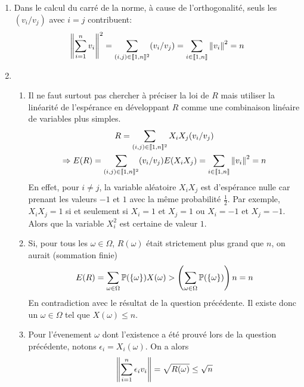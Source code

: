 \begin{enumerate}
  \item Dans le calcul du carré de la norme, à cause de l'orthogonalité, seuls les $(v_i/v_j)$ avec $i=j$ contribuent:
\begin{displaymath}
  \left\Vert\sum_{i=1}^n v_i\right\Vert^2 = 
\sum_{(i,j)\in \llbracket 1,n\rrbracket^2}(v_i/v_j) = \sum_{i\in \llbracket 1,n\rrbracket} \left\Vert v_i\right\Vert^2 = n
\end{displaymath}

  \item
\begin{enumerate}
  \item Il ne faut surtout pas chercher à préciser la loi de $R$ mais utiliser la linéarité de l'espérance en développant $R$ comme une combinaison linéaire de variables plus simples.
\begin{multline*}
 R =  \sum_{(i,j)\in \llbracket 1,n\rrbracket^2}X_iX_j(v_i/v_j)\\
\Rightarrow
E(R) = \sum_{(i,j)\in \llbracket 1,n\rrbracket^2}(v_i/v_j)E(X_iX_j) = \sum_{i\in \llbracket 1,n\rrbracket} \left\Vert v_i\right\Vert^2 = n
\end{multline*}
En effet, pour $i\neq j$, la variable aléatoire $X_iX_j$ est d'espérance nulle car prenant les valeurs $-1$ et $1$ avec la même probabilité $\frac{1}{2}$. Par exemple, $X_iX_j=1$ si et seulement si $X_i=1$ et $X_j=1$ ou $X_i=-1$ et $X_j=-1$. Alors que la variable $X_i^2$ est certaine de valeur $1$.  
  \item Si, pour tous les $\omega\in \Omega$, $R(\omega)$ était strictement plus grand que $n$, on aurait (sommation finie)
\begin{displaymath}
E(R) = \sum_{\omega\in \Omega}\mathbb{P}(\left\{\omega\right\})X(\omega) > \left( \sum_{\omega\in \Omega}\mathbb{P}(\left\{\omega\right\})\right)n = n  
\end{displaymath}
En contradiction avec le résultat de la question précédente. Il existe donc un $\omega\in \Omega$ tel que $X(\omega)\leq n$.
  \item Pour l'évenement $\omega$ dont l'existence a été prouvé lors de la question précédente, notons $\epsilon_i = X_i(\omega)$. On a alors
\begin{displaymath}
  \left\Vert\sum_{i=1}^n \epsilon_i v_i\right\Vert = \sqrt{R(\omega)} \leq \sqrt{n}
\end{displaymath}
\end{enumerate}


\end{enumerate}
